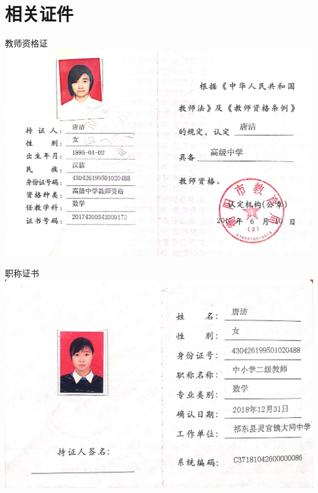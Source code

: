 \documentclass[UFT8]{ctexart}%
\begin{document}
\clearpage
\section{相关证件}
\begin{center}
教师资格证
  \includegraphics[scale=0.20]{figs/教师资格证.JPG }

职称证书
  \includegraphics[scale=0.25]{figs/中二职称证书.JPG }
  

\end{center}
\end{document}
